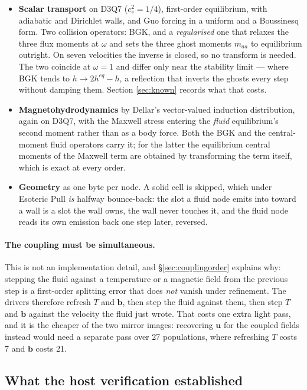 \documentclass[11pt,a4paper]{article}
\newcommand{\cs}{c_s}
\newcommand{\uu}{\bm{u}}
\newcommand{\bb}{\bm{b}}
\begin{document}
\begin{itemize}[leftmargin=1.4em,itemsep=3pt]
\item \textbf{Scalar transport} on D3Q7 ($\cs^2=1/4$), first-order equilibrium,
  with adiabatic and Dirichlet walls, and Guo forcing in a uniform and a
  Boussinesq form. Two collision operators: BGK, and a \emph{regularised} one
  that relaxes the three flux moments at $\omega$ and sets the three ghost
  moments $m_{aa}$ to equilibrium outright. On seven velocities the inverse is
  closed, so no transform is needed. The two coincide at $\omega=1$ and differ
  only near the stability limit --- where BGK tends to $h\to 2h^{eq}-h$, a
  reflection that inverts the ghosts every step without damping them. Section
  \ref{sec:known} records what that costs.
\item \textbf{Magnetohydrodynamics} by Dellar's vector-valued induction
  distribution, again on D3Q7, with the Maxwell stress entering the
  \emph{fluid} equilibrium's second moment rather than as a body force. Both the
  BGK and the central-moment fluid operators carry it; for the latter the
  equilibrium central moments of the Maxwell term are obtained by transforming
  the term itself, which is exact at every order.
\item \textbf{Geometry} as one byte per node. A solid cell is skipped, which
  under Esoteric Pull \emph{is} halfway bounce-back: the slot a fluid node emits
  into toward a wall is a slot the wall owns, the wall never touches it, and the
  fluid node reads its own emission back one step later, reversed.
\end{itemize}

\paragraph{The coupling must be simultaneous.} This is not an implementation
detail, and \S\ref{sec:couplingorder} explains why: stepping the fluid against a
temperature or a magnetic field from the previous step is a first-order splitting
error that does \emph{not} vanish under refinement. The drivers therefore refresh
$T$ and $\bb$, then step the fluid against them, then step $T$ and $\bb$ against
the velocity the fluid just wrote. That costs one extra light pass, and it is the
cheaper of the two mirror images: recovering $\uu$ for the coupled fields instead
would need a separate pass over 27 populations, where refreshing $T$ costs 7 and
$\bb$ costs 21.

\subsection{What the host verification established}
\end{document}
